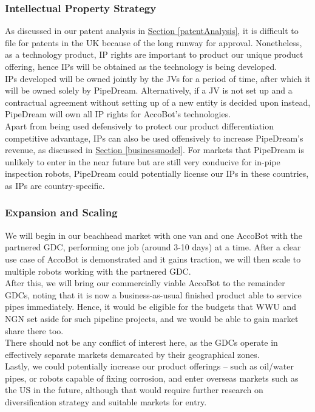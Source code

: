 \documentclass[11pt]{article}		%
\newcommand{\sectref}[1]{\hyperref[#1]{Section \ref*{#1}}}     %
\begin{document}
    	\subsubsection{Intellectual Property Strategy}\label{IPstrategy}
    	As discussed in our patent analysis in \sectref{patentAnalysis}, it is difficult to file for patents in the UK because of the long runway for approval. Nonetheless, as a technology product, IP rights are important to product our unique product offering, hence IPs will be obtained as the technology is being developed.
        \\
        \hspace*{3ex}IPs developed will be owned jointly by the JVs for a period of time, after which it will be owned solely by PipeDream. Alternatively, if a JV is not set up and a contractual agreement without setting up of a new entity is decided upon instead, PipeDream will own all IP rights for AccoBot’s technologies. 
        \\
        \hspace*{3ex}Apart from being used defensively to protect our product differentiation competitive advantage, IPs can also be used offensively to increase PipeDream’s revenue, as discussed in \sectref{businessmodel}. For markets that PipeDream is unlikely to enter in the near future but are still very conducive for in-pipe inspection robots, PipeDream could potentially license our IPs in these countries, as IPs are country-specific. 
    
    	\subsubsection{Expansion and Scaling}
    	We will begin in our beachhead market with one van and one AccoBot with the partnered GDC, performing one job (around 3-10 days) at a time. After a clear use case of AccoBot is demonstrated and it gains traction, we will then scale to multiple robots working with the partnered GDC.
        \\
        \hspace*{3ex}After this, we will bring our commercially viable AccoBot to the remainder GDCs, noting that it is now a business-as-usual finished product able to service pipes immediately. Hence, it would be eligible for the budgets that WWU and NGN set aside for such pipeline projects, and we would be able to gain market share there too. 
        \\
        \hspace*{3ex}There should not be any conflict of interest here, as the GDCs operate in effectively separate markets demarcated by their geographical zones. 
        \\
        \hspace*{3ex}Lastly, we could potentially increase our product offerings – such as oil/water pipes, or robots capable of fixing corrosion, and enter overseas markets such as the US in the future, although that would require further research on diversification strategy and suitable markets for entry. 
    
\end{document}
